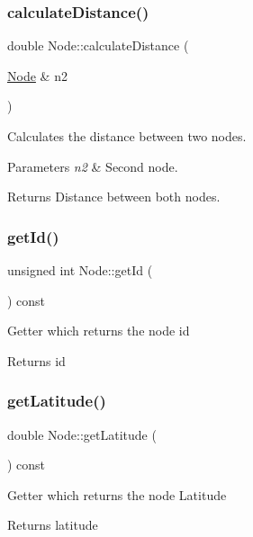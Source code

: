 \subsubsection{\texorpdfstring{calculate\+Distance()}{calculateDistance()}}
{\footnotesize\ttfamily double Node\+::calculate\+Distance (\begin{DoxyParamCaption}\item[{\mbox{\hyperlink{class_node}{Node}} \&}]{n2 }\end{DoxyParamCaption})}

Calculates the distance between two nodes. 
\begin{DoxyParams}{Parameters}
{\em n2} & Second node. \\
\hline
\end{DoxyParams}
\begin{DoxyReturn}{Returns}
Distance between both nodes. 
\end{DoxyReturn}
\mbox{\label{class_node_af9b4c1c72ce14b69f5e99deb4440f489}} 
\subsubsection{\texorpdfstring{get\+Id()}{getId()}}
{\footnotesize\ttfamily unsigned int Node\+::get\+Id (\begin{DoxyParamCaption}{ }\end{DoxyParamCaption}) const}

Getter which returns the node id \begin{DoxyReturn}{Returns}
id 
\end{DoxyReturn}
\mbox{\label{class_node_a6a76240688eddc8a2942618074e28c92}} 
\subsubsection{\texorpdfstring{get\+Latitude()}{getLatitude()}}
{\footnotesize\ttfamily double Node\+::get\+Latitude (\begin{DoxyParamCaption}{ }\end{DoxyParamCaption}) const}

Getter which returns the node Latitude \begin{DoxyReturn}{Returns}
latitude 
\end{DoxyReturn}
\mbox{\label{class_node_ad4a79ebbcca46dae4638ffbe4d732399}} 
